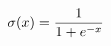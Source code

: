 \documentclass[preview]{standalone}
\begin{document}
\begin{align*}
\special{dvisvgm:raw <g id='unique000'>}\sigma(x) = \frac{1}{1+e^{-x}}\special{dvisvgm:raw </g>}
\end{align*}
\end{document}
